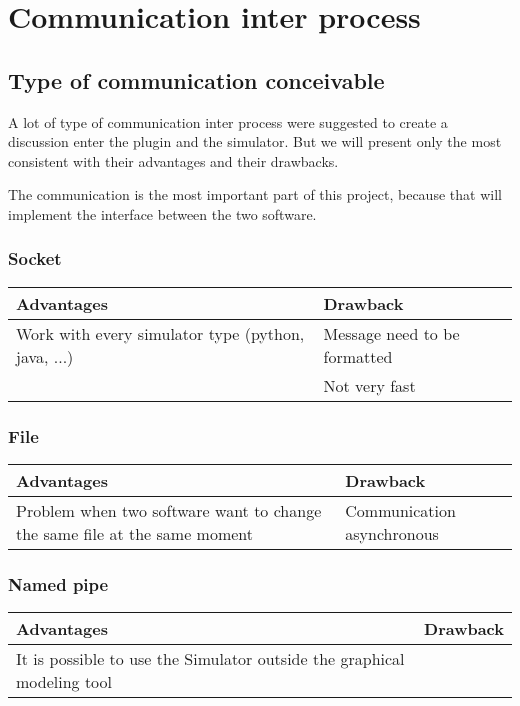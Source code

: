 
\chapter{Communication inter process}

\section{Type of communication conceivable}

A lot of type of communication inter process were suggested to create
a discussion enter the plugin and the simulator. But we will present
only the most consistent with their advantages and their drawbacks.

The communication is the most important part of this project, because
that will implement the interface between the two software.


\subsection{Socket}

\begin{tabular}{|p{}||p{}|}
\hline
  \textbf{Advantages}&\textbf{Drawback}\\
\hline
Work with every simulator type (python, java, ...) & Message need to be formatted\\
\hline
& Not very fast\\
\hline
\end{tabular}

\subsection{File}

\begin{tabular}{|p{}||p{}|}
\hline
  \textbf{Advantages}&\textbf{Drawback}\\
\hline
Problem when two software want to change the same file at the same moment& Communication asynchronous\\
\hline
\end{tabular}

\subsection{Named pipe}

\begin{tabular}{|p{}||p{}|}
\hline
  \textbf{Advantages}&\textbf{Drawback}\\
\hline
It is possible to use the Simulator outside the graphical modeling tool & \\
\hline
\end{tabular}



